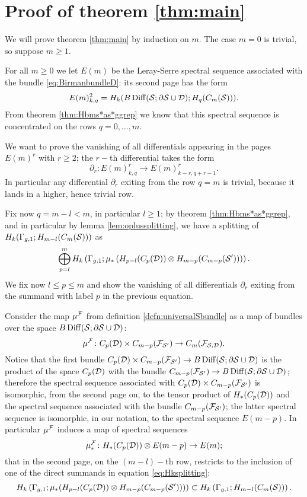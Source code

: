 \section{Proof of theorem \ref{thm:main}}
We will prove theorem \ref{thm:main} by induction on $m$.
The case $m=0$ is trivial, so suppose $m\geq 1$.

For all $m\geq 0$ we let $E(m)$ be the Leray-Serre spectral sequence associated with
the bundle \ref{eq:BirmanbundleD}: its second page has the form
\[
 E(m)^2_{k,q}=H_k(B\operatorname{Diff}(\mathcal{S};\partial\mathcal{S}\cup\mathcal{D});H_q(C_m(\mathcal{S}))).
\]
From theorem \ref{thm:Hbms*as*ggrep} we know that this spectral sequence is concentrated
on the rows $q=0,\dots, m$.

We want to prove the vanishing of all differentials appearing in the pages
$E(m)^r$ with $r\geq 2$; the $r-$th differential takes the form
\[
 \partial_r\colon E(m)^r_{k,q}\to E(m)^r_{k-r,q+r-1}.
\]
In particular any differential $\partial_r$ exiting from the row $q=m$ is trivial,
because it lands in a higher, hence trivial row.

Fix now $q=m-l<m$, in particular $l\geq 1$; by theorem \ref{thm:Hbms*as*ggrep}, and
in particular by lemma \ref{lem:oplussplitting}, we have a splitting of $H_k(\Gamma_{g,1};H_{m-l}(C_m(\mathcal{S})))$ as
\begin{equation}
\label{eq:Hksplitting}
 \bigoplus_{p=l}^m H_k\left(\Gamma_{g,1};\mu_*\left(H_{p-l}(C_p(\mathcal{D}))\otimes H_{m-p}(C_{m-p}(\mathcal{S}'))\right)\right).
\end{equation} 
We fix now $l\leq p\leq m$ and show the vanishing of all differentials $\partial_r$ exiting from the
summand with label $p$ in the previous equation.

Consider the map $\mu^{\mathcal{F}}$ from definition \ref{defn:universalSbundle} as a map of
bundles over the space $B\operatorname{Diff}(\mathcal{S};\partial\mathcal{S}\cup\mathcal{D})$:
\[
 \mu^{\mathcal{F}}\colon C_p(\mathcal{D})\times C_{m-p}(\mathcal{F}_{\mathcal{S}'})\to C_m(\mathcal{F}_{\mathcal{S},\mathcal{D}}).
\]
Notice that the first bundle $C_p(\mathcal{D})\times C_{m-p}(\mathcal{F}_{\mathcal{S}'})\to B\operatorname{Diff}(\mathcal{S};\partial\mathcal{S}\cup\mathcal{D})$
is the product of the space $C_p(\mathcal{D})$ with the bundle $C_{m-p}(\mathcal{F}_{\mathcal{S}'})\to B\operatorname{Diff}(\mathcal{S};\partial\mathcal{S}\cup\mathcal{D})$;
therefore the spectral sequence associated with $C_p(\mathcal{D})\times C_{m-p}(\mathcal{F}_{\mathcal{S}'})$ is isomorphic,
from the second page on, to the tensor product
of $H_*(C_p(\mathcal{D}))$ and the spectral sequence associated with the bundle $C_{m-p}(\mathcal{F}_{\mathcal{S}'})$; the
latter spectral sequence is isomorphic, in our notation, to the spectral sequence $E(m-p)$.
In particular $\mu^{\mathcal{F}}$ induces a map of spectral
sequences
\[
\mu^{\mathcal{F}}_*\colon H_*(C_p(\mathcal{D}))\otimes E(m-p)\to E(m);
\]
that in the second page, on the $(m-l)-$th row, restricts to
the inclusion of one of the direct summands in equation \ref{eq:Hksplitting}:
\[
H_k\left(\Gamma_{g,1};\mu_*(H_{p-l}(C_p(\mathcal{D}))\otimes H_{m-p}(C_{m-p}(\mathcal{S}')))\right)\subset H_k\left(\Gamma_{g,1};H_{m-l}(C_m(\mathcal{S}))\right).
\]

